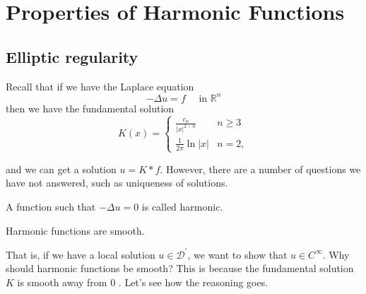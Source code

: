 \newpage
\section{Properties of Harmonic Functions}

\subsection{Elliptic regularity}
Recall that if we have the Laplace equation
$$
-\Delta u=f \quad \text { in } \mathbb{R}^{n}
$$
then we have the fundamental solution
$$
K(x)= 
\begin{cases}
    \frac{c_{n}}{|x|^{2-n}} & n \geq 3 \\ 
    \frac{1}{2 \pi} \ln |x| & n=2,
\end{cases}
$$

and we can get a solution $u=K * f$. However, there are a number of questions we have not answered, such as uniqueness of solutions.

\begin{definition}
    [Harmonic]
    A function such that $-\Delta u = 0$ is called harmonic.
\end{definition}

\begin{theorem}
    Harmonic functions are smooth.
\end{theorem}

That is, if we have a local solution $u \in \mathcal{D}^{\prime}$, we want to show that $u \in C^{\infty}$. Why should harmonic functions be smooth? This is because the fundamental solution $K$ is smooth away from 0 . Let's see how the reasoning goes.

